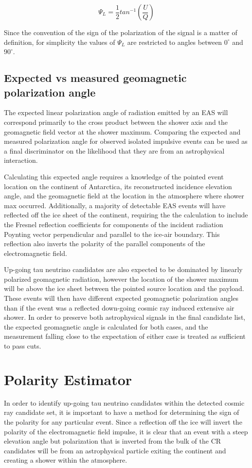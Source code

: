 	\begin{equation}
		\Psi_{L} = \frac{1}{2}tan^{-1}(\frac{U}{Q})
	\label{eqn:polAngle}
	\end{equation}
		
		Since the convention of the sign of the polarization of the signal is a matter of definition, for simplicity the values of $\Psi_{L}$ are restricted to angles between $0^\circ$ and $90^\circ$.
		
	\subsection{Expected vs measured geomagnetic polarization angle}
		The expected linear polarization angle of radiation emitted by an EAS will correspond primarily to the cross product between the shower axis and the geomagnetic field vector at the shower maximum.  Comparing the expected and measured polarization angle for observed isolated impulsive events can be used as a final discriminator on the likelihood that they are from an astrophysical interaction.  
		
		Calculating this expected angle requires a knowledge of the pointed event location on the continent of Antarctica, its reconstructed incidence elevation angle, and the geomagnetic field at the location in the atmosphere where shower max occurred.  Additionally, a majority of detectable EAS events will have reflected off the ice sheet of the continent, requiring the the calculation to include the Fresnel reflection coefficients for components of the incident radiation Poynting vector perpendicular and parallel to the ice-air boundary.  This reflection also inverts the polarity of the parallel components of the electromagnetic field.
		
		Up-going tau neutrino candidates are also expected to be dominated by linearly polarized geomagnetic radiation, however the location of the shower maximum will be above the ice sheet between the pointed source location and the payload.  These events will then have different expected geomagnetic polarization angles than if the event was a reflected down-going cosmic ray induced extensive air shower.  In order to preserve both astrophysical signals in the final candidate list, the expected geomagnetic angle is calculated for both cases, and the measurement falling close to the expectation of either case is treated as sufficient to pass cuts.
		
		
\section{Polarity Estimator}%
	In order to identify up-going tau neutrino candidates within the detected cosmic ray candidate set, it is important to have a method for determining the sign of the polarity for any particular event.  Since a reflection off the ice will invert the polarity of the electromagnetic field impulse, it is clear that an event with a steep elevation angle but polarization that is inverted from the bulk of the CR candidates will be from an astrophysical particle exiting the continent and creating a shower within the atmosphere.
	
